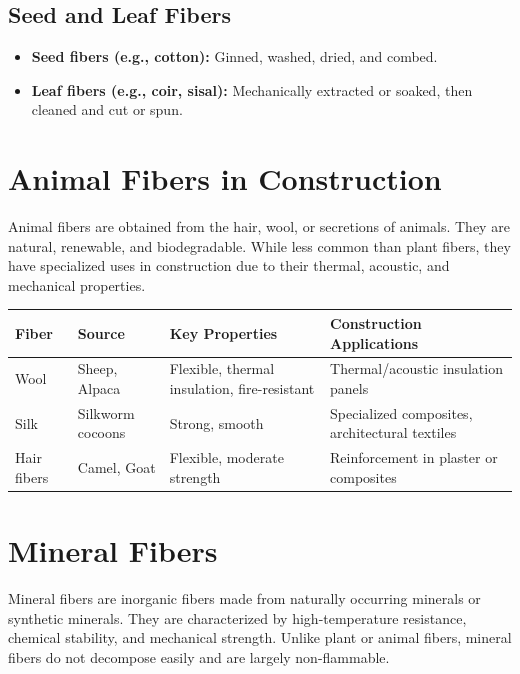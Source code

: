 \documentclass[12pt,a4paper]{article}
\begin{document}
\subsection{Seed and Leaf Fibers}
\begin{itemize}
    \item \textbf{Seed fibers (e.g., cotton):} Ginned, washed, dried, and combed.
    \item \textbf{Leaf fibers (e.g., coir, sisal):} Mechanically extracted or soaked, then cleaned and cut or spun.
\end{itemize}

\section{Animal Fibers in Construction}

Animal fibers are obtained from the hair, wool, or secretions of animals. They are natural, renewable, and biodegradable. While less common than plant fibers, they have specialized uses in construction due to their thermal, acoustic, and mechanical properties.

\begin{center}
\renewcommand{\arraystretch}{1.4}
\begin{tabular}{|l|l|p{4cm}|p{4.5cm}|}
\hline
\textbf{Fiber} & \textbf{Source} & \textbf{Key Properties} & \textbf{Construction Applications} \\
\hline
Wool & Sheep, Alpaca & Flexible, thermal insulation, fire-resistant & Thermal/acoustic insulation panels \\
\hline
Silk & Silkworm cocoons & Strong, smooth & Specialized composites, architectural textiles \\
\hline
Hair fibers & Camel, Goat & Flexible, moderate strength & Reinforcement in plaster or composites \\
\hline
\end{tabular}
\end{center}

\section{Mineral Fibers}

Mineral fibers are inorganic fibers made from naturally occurring minerals or synthetic minerals. They are characterized by high-temperature resistance, chemical stability, and mechanical strength. Unlike plant or animal fibers, mineral fibers do not decompose easily and are largely non-flammable.
\end{document}
